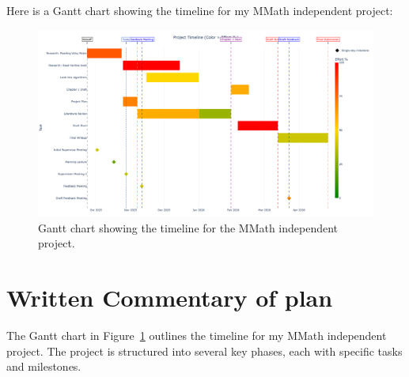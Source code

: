 Here is a Gantt chart showing the timeline for my MMath independent project:


\begin{figure}[h] %
    \centering
    \includegraphics[width=1.2\textwidth]{newplot(3)} %
    \caption{Gantt chart showing the timeline for the MMath independent project.}
    \label{fig:gantt_chart}
\end{figure}

\begin{center}
\end{center}

\section*{Written Commentary of plan}
The Gantt chart in Figure~\ref{fig:gantt_chart} outlines the timeline for my MMath independent project. The project is structured into several key phases, each with specific tasks and milestones.

